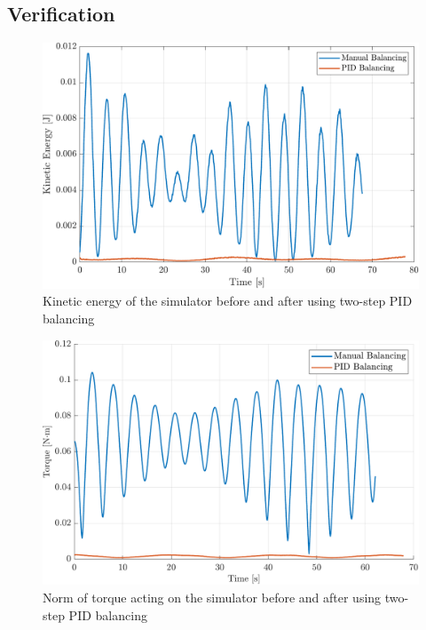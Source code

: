 \subsection{Verification}

\begin{figure}[ht]
    \centering
    \includegraphics[width=\linewidth]{plots/hardware_verification_KE.pdf}
    \caption{Kinetic energy of the simulator before and after using two-step PID balancing}
\end{figure}

\begin{figure}[ht]
    \centering
    \includegraphics[width=\linewidth]{plots/hardware_verification_torque.pdf}
    \caption{Norm of torque acting on the simulator before and after using two-step PID balancing}
\end{figure}

